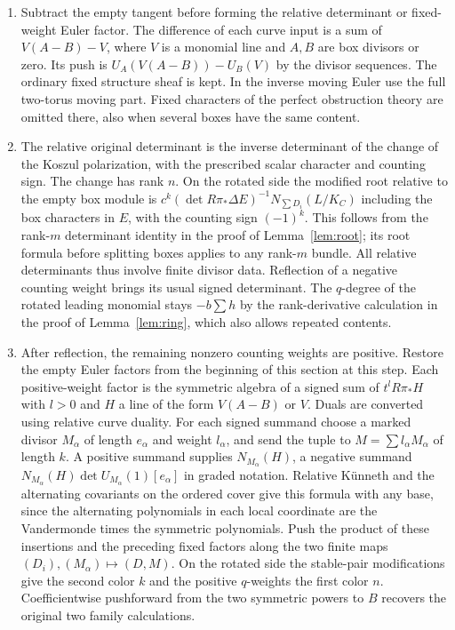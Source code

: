 \begin{enumerate}\item Subtract the empty tangent before forming the relative determinant or fixed-weight Euler factor. The difference of each curve input is a sum of $V(A-B)-V$, where $V$ is a monomial line and $A,B$ are box divisors or zero. Its push is $U_A(V(A-B))-U_B(V)$ by the divisor sequences. The ordinary fixed structure sheaf is kept. In the inverse moving Euler use the full two-torus moving part. Fixed characters of the perfect obstruction theory are omitted there, also when several boxes have the same content.
\item The relative original determinant is the inverse determinant of the change of the Koszul polarization, with the prescribed scalar character and counting sign. The change has rank $n$. On the rotated side the modified root relative to the empty box module is $c^k(\det R\pi_*\Delta E)^{-1}N_{\sum D_i}(L/K_C)$ including the box characters in $E$, with the counting sign $(-1)^k$. This follows from the rank-$m$ determinant identity in the proof of Lemma~\ref{lem:root}; its root formula before splitting boxes applies to any rank-$m$ bundle. All relative determinants thus involve finite divisor data. Reflection of a negative counting weight brings its usual signed determinant. The $q$-degree of the rotated leading monomial stays $-b\sum h$ by the rank-derivative calculation in the proof of Lemma~\ref{lem:ring}, which also allows repeated contents.
\item After reflection, the remaining nonzero counting weights are positive. Restore the empty Euler factors from the beginning of this section at this step. Each positive-weight factor is the symmetric algebra of a signed sum of $t^lR\pi_*H$ with $l>0$ and $H$ a line of the form $V(A-B)$ or $V$. Duals are converted using relative curve duality. For each signed summand choose a marked divisor $M_\alpha$ of length $e_\alpha$ and weight $l_\alpha$, and send the tuple to $M=\sum l_\alpha M_\alpha$ of length $k$. A positive summand supplies $N_{M_\alpha}(H)$, a negative summand $N_{M_\alpha}(H)\det U_{M_\alpha}(1)[e_\alpha]$ in graded notation. Relative K\"unneth and the alternating covariants on the ordered cover give this formula with any base, since the alternating polynomials in each local coordinate are the Vandermonde times the symmetric polynomials. Push the product of these insertions and the preceding fixed factors along the two finite maps $(D_i),(M_\alpha)\mapsto(D,M)$. On the rotated side the stable-pair modifications give the second color $k$ and the positive $q$-weights the first color $n$. Coefficientwise pushforward from the two symmetric powers to $B$ recovers the original two family calculations.

\end{enumerate}

